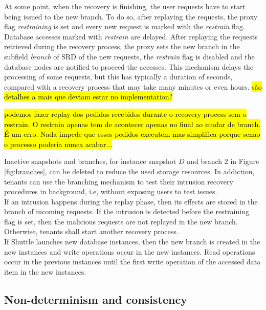 At some point, when the recovery is finishing, the user requests have to start being issued to the new branch. To do so, after replaying the requests, the proxy flag \emph{restraining} is set and every new request is marked with the \emph{restrain} flag. Database accesses marked with \emph{restrain} are delayed. After replaying the requests retrieved during the recovery process, the proxy sets the new branch in the subfield \emph{branch} of \ac{SRD} of the new requests, the \emph{restrain} flag is disabled and the database nodes are notified to proceed the accesses. This mechanism delays the processing of some requests, but this has typically a duration of seconds, compared with a recovery process that may take many minutes or even hours. \hl{são detalhes a mais que deviam estar no implementation?}

\hl{podemos fazer replay dos pedidos recebidos durante o recovery process sem o restrain. O restrain apenas tem de acontecer apenas no final ao mudar de branch. É um erro. Nada impede que esses pedidos executem mas simplifica porque senao o processo poderia nunca acabar...}

Inactive snapshots and branches, for instance snapshot $D$ and branch 2 in Figure \ref{fig:branches}, can be deleted to reduce the used storage resources. In addiction, tenants can use the branching mechanism to test their intrusion recovery procedures in background, i.e, without exposing users to test issues.\\

If an intrusion happens during the replay phase, then its effects are stored in the branch of incoming requests. If the intrusion is detected before the restraining flag is set, then the malicious requests are not replayed in the new branch. Otherwise, tenants shall start another recovery process.\\

If Shuttle launches new database instances, then the new branch is created in the new instances and write operations occur in the new instances. Read operations occur in the previous instances until the first write operation of the accessed data item in the new instances.



\subsection{Non-determinism and consistency}
\label{sec:arch:consistency}

